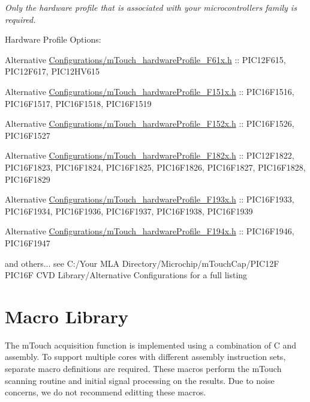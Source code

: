 {\itshape Only the hardware profile that is associated with your microcontroller\textquotesingle{}s family is required.}

Hardware Profile Options\+: \begin{DoxyItemize}
\item Alternative \hyperlink{m_touch__hardware_profile__12_f61x_8h}{Configurations/m\+Touch\+\_\+hardware\+Profile\+\_\+F61x.\+h} \+:\+: P\+I\+C12\+F615, P\+I\+C12\+F617, P\+I\+C12\+H\+V615 \item Alternative \hyperlink{m_touch__hardware_profile__16_f151x_8h}{Configurations/m\+Touch\+\_\+hardware\+Profile\+\_\+F151x.\+h} \+:\+: P\+I\+C16\+F1516, P\+I\+C16\+F1517, P\+I\+C16\+F1518, P\+I\+C16\+F1519 \item Alternative \hyperlink{m_touch__hardware_profile__16_f152x_8h}{Configurations/m\+Touch\+\_\+hardware\+Profile\+\_\+F152x.\+h} \+:\+: P\+I\+C16\+F1526, P\+I\+C16\+F1527 \item Alternative \hyperlink{m_touch__hardware_profile__16_f182x_8h}{Configurations/m\+Touch\+\_\+hardware\+Profile\+\_\+F182x.\+h} \+:\+: P\+I\+C12\+F1822, P\+I\+C16\+F1823, P\+I\+C16\+F1824, P\+I\+C16\+F1825, P\+I\+C16\+F1826, P\+I\+C16\+F1827, P\+I\+C16\+F1828, P\+I\+C16\+F1829 \item Alternative \hyperlink{m_touch__hardware_profile__16_f193x_8h}{Configurations/m\+Touch\+\_\+hardware\+Profile\+\_\+F193x.\+h} \+:\+: P\+I\+C16\+F1933, P\+I\+C16\+F1934, P\+I\+C16\+F1936, P\+I\+C16\+F1937, P\+I\+C16\+F1938, P\+I\+C16\+F1939 \item Alternative \hyperlink{m_touch__hardware_profile__16_f194x_8h}{Configurations/m\+Touch\+\_\+hardware\+Profile\+\_\+F194x.\+h} \+:\+: P\+I\+C16\+F1946, P\+I\+C16\+F1947 \item and others... see {\ttfamily C\+:/\+Your M\+L\+A Directory/\+Microchip/m\+Touch\+Cap/\+P\+I\+C12\+F P\+I\+C16\+F C\+V\+D Library/\+Alternative Configurations} for a full listing\end{DoxyItemize}
\hypertarget{_required_includes_RI_MacroLibrary}{}\section{Macro Library}\label{_required_includes_RI_MacroLibrary}
The m\+Touch acquisition function is implemented using a combination of C and assembly. To support multiple cores with different assembly instruction sets, separate macro definitions are required. These macros perform the m\+Touch scanning routine and initial signal processing on the results. Due to noise concerns, we do not recommend editting these macros.

